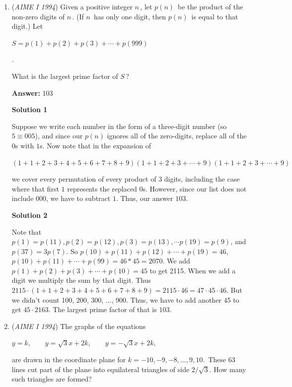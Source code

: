\begin{enumerate}
 


	\item (\textit{AIME I 1994}) Given a positive integer $n\,$, let $p(n)\,$ be the product of the non-zero digits of $n\,$.  (If $n\,$ has only one digit, then $p(n)\,$ is equal to that digit.)  Let


 $S=p(1)+p(2)+p(3)+\cdots+p(999)$

 .


 What is the largest prime factor of $S\,$?


 
 \textbf{Answer: }103



\textbf{Solution 1}

Suppose we write each number in the form of a three-digit number (so $5 \equiv 005$), and since our $p(n)$ ignores all of the zero-digits, replace all of the $0$s with $1$s. Now note that in the expansion of 

 $(1+ 1 +2+3+4+5+6+7+8+9) (1+ 1 +2+3+\cdots+9) (1+ 1 +2+3+\cdots+9)$

 we cover every permutation of every product of $3$ digits, including the case where that first $1$ represents the replaced $0$s. However, since our list does not include $000$, we have to subtract $1$. Thus, our answer $\boxed{103}$.

 



\textbf{Solution 2}

Note that $p(1)=p(11), p(2)=p(12), p(3)=p(13), \cdots p(19)=p(9)$, and $p(37)=3p(7)$. So $p(10)+p(11)+p(12)+\cdots +p(19)=46$, $p(10)+p(11)+\cdots +p(99)=46*45=2070$. We add $p(1)+p(2)+p(3)+\cdots +p(10)=45$ to get 2115. When we add a digit we multiply the sum by that digit. Thus $2115\cdot (1+1+2+3+4+5+6+7+8+9)=2115\cdot 46=47\cdot 45\cdot 46$. But we didn't count 100, 200, 300, ..., 900. Thus, we have to add another 45 to get $45\cdot 2163$. The largest prime factor of that is $\boxed{103}$.

 


	\item (\textit{AIME I 1994}) The graphs of the equations


 $y=k, \qquad y=\sqrt{3}x+2k, \qquad y=-\sqrt{3}x+2k,$

 are drawn in the coordinate plane for $k=-10,-9,-8,\ldots,9,10.\,$  These 63 lines cut part of the plane into equilateral triangles of side $2/\sqrt{3}$.  How many such triangles are formed?



\end{enumerate}
